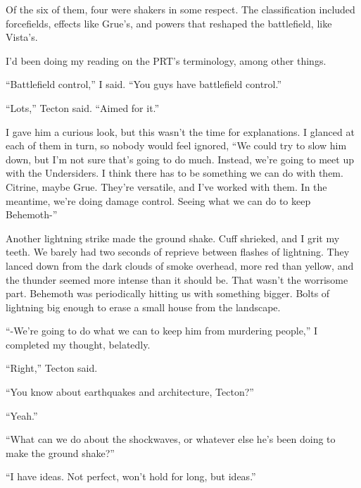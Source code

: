Of the six of them, four were shakers in some respect.  The classification included forcefields, effects like Grue's, and powers that reshaped the battlefield, like Vista's.



I'd been doing my reading on the PRT's terminology, among other things.



``Battlefield control,'' I said. ``You guys have battlefield control.''



``Lots,'' Tecton said.  ``Aimed for it.''



I gave him a curious look, but this wasn't the time for explanations.  I glanced at each of them in turn, so nobody would feel ignored, ``We could try to slow him down, but I'm not sure that's going to do much.  Instead, we're going to meet up with the Undersiders.  I think there has to be something we can do with them.  Citrine, maybe Grue.  They're versatile, and I've worked with them.   In the meantime, we're doing damage control.  Seeing what we can do to keep Behemoth-''



Another lightning strike made the ground shake.  Cuff shrieked, and I grit my teeth.  We barely had two seconds of reprieve between flashes of lightning.  They lanced down from the dark clouds of smoke overhead, more red than yellow, and the thunder seemed more intense than it should be.  That wasn't the worrisome part.  Behemoth was periodically hitting us with something bigger.  Bolts of lightning big enough to erase a small house from the landscape.



``-We're going to do what we can to keep him from murdering people,'' I completed my thought, belatedly.



``Right,'' Tecton said.



``You know about earthquakes and architecture, Tecton?''



``Yeah.''



``What can we do about the shockwaves, or whatever else he's been doing to make the ground shake?''



``I have ideas.  Not perfect, won't hold for long, but ideas.''



